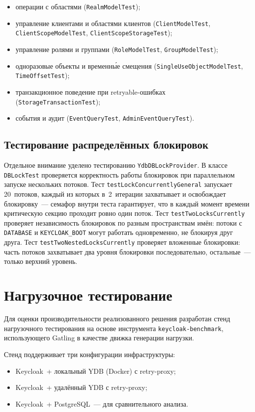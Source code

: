 \documentclass[times]{itmo-student-thesis}
\begin{document}
\begin{itemize}
    \item операции с областями (\texttt{RealmModelTest});
    \item управление клиентами и областями клиентов (\texttt{ClientModelTest},
          \texttt{ClientScopeModelTest}, \texttt{ClientScopeStorageTest});
    \item управление ролями и группами (\texttt{RoleModelTest}, \texttt{GroupModelTest});
    \item одноразовые объекты и временны́е смещения (\texttt{SingleUseObjectModelTest},
          \texttt{TimeOffsetTest});
    \item транзакционное поведение при retryable-ошибках (\texttt{StorageTransactionTest});
    \item события и аудит (\texttt{EventQueryTest}, \texttt{AdminEventQueryTest}).
\end{itemize}

\subsection{Тестирование распределённых блокировок}

Отдельное внимание уделено тестированию \texttt{YdbDBLockProvider}.
В классе \texttt{DBLockTest} проверяется корректность работы блокировок
при параллельном запуске нескольких потоков.
Тест \texttt{testLockConcurrentlyGeneral} запускает 20~потоков,
каждый из которых в~2~итерации захватывает и освобождает блокировку~---
семафор внутри теста гарантирует, что в каждый момент времени
критическую секцию проходит ровно один поток.
Тест \texttt{testTwoLocksCurrently} проверяет независимость блокировок
по разным пространствам имён: потоки с \texttt{DATABASE} и \texttt{KEYCLOAK\_BOOT}
могут работать одновременно, не блокируя друг друга.
Тест \texttt{testTwoNestedLocksCurrently} проверяет вложенные блокировки:
часть потоков захватывает два уровня блокировки последовательно,
остальные~--- только верхний уровень.

\section{Нагрузочное тестирование}

Для оценки производительности реализованного решения разработан стенд нагрузочного
тестирования на основе инструмента \texttt{keycloak-benchmark},
использующего Gatling в качестве движка генерации нагрузки.

Стенд поддерживает три конфигурации инфраструктуры:
\begin{itemize}
    \item Keycloak~+ локальный YDB (Docker) с retry-proxy;
    \item Keycloak~+ удалённый YDB с retry-proxy;
    \item Keycloak~+ PostgreSQL~--- для сравнительного анализа.
\end{itemize}
\end{document}
